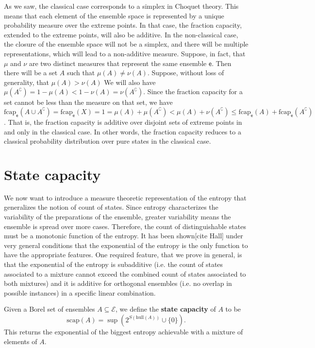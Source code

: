 \documentclass[10pt,twocolumn, nofootinbib]{revtex4-2}
\newcommand\hull{\mathrm{hull}}
\newcommand\capacity{\mathrm{scap}}
\newcommand\frcap{\mathrm{fcap}}
\newcommand{\ens}[1][e] {\mathsf{#1}} %
\newcommand{\Ens}[1][E] {\mathcal{#1}} %
\begin{document}
As we saw, the classical case corresponds to a simplex in Choquet theory. This means that each element of the ensemble space is represented by a unique probability measure over the extreme points. In that case, the fraction capacity, extended to the extreme points, will also be additive. In the non-classical case, the closure of the ensemble space will not be a simplex, and there will be multiple representations, which will lead to a non-additive measure. Suppose, in fact, that $\mu$ and $\nu$ are two distinct measures that represent the same ensemble $\ens$. Then there will be a set $A$ such that $\mu(A) \neq \nu(A)$. Suppose, without loss of generality, that $\mu(A) > \nu(A)$ We will also have $\mu(A^{\complement}) = 1- \mu(A) < 1 - \nu(A) = \nu(A^{\complement})$. Since the fraction capacity for a set cannot be less than the measure on that set, we have $\frcap_{\ens}(A \cup A^{\complement})=\frcap_{\ens}(X) = 1 = \mu(A) + \mu(A^{\complement}) < \mu(A) + \nu(A^{\complement}) \leq \frcap_{\ens}(A) + \frcap_{\ens}(A^{\complement})$. That is, the fraction capacity is additive over disjoint sets of extreme points in and only in the classical case. In other words, the fraction capacity reduces to a classical probability distribution over pure states in the classical case.

\section{State capacity}

We now want to introduce a measure theoretic representation of the entropy that generalizes the notion of count of states. Since entropy characterizes the variability of the preparations of the ensemble, greater variability means the ensemble is spread over more cases. Therefore, the count of distinguishable states must be a monotonic function of the entropy. It has been shown[cite Hall] under very general conditions that the exponential of the entropy is the only function to have the appropriate features. One required feature, that we prove in general, is that the exponential of the entropy is subadditive (i.e. the count of states associated to a mixture cannot exceed the combined count of states associated to both mixtures) and it is additive for orthogonal ensembles (i.e. no overlap in possible instances) in a specific linear combination.

Given a Borel set of ensembles $A \subseteq \Ens$, we define the \textbf{state capacity} of $A$ to be
\begin{equation}
\capacity(A) = \sup(2^{S(\hull(A))}\cup\{0\}).
\end{equation}
This returns the exponential of the biggest entropy achievable with a mixture of elements of $A$.
\end{document}
